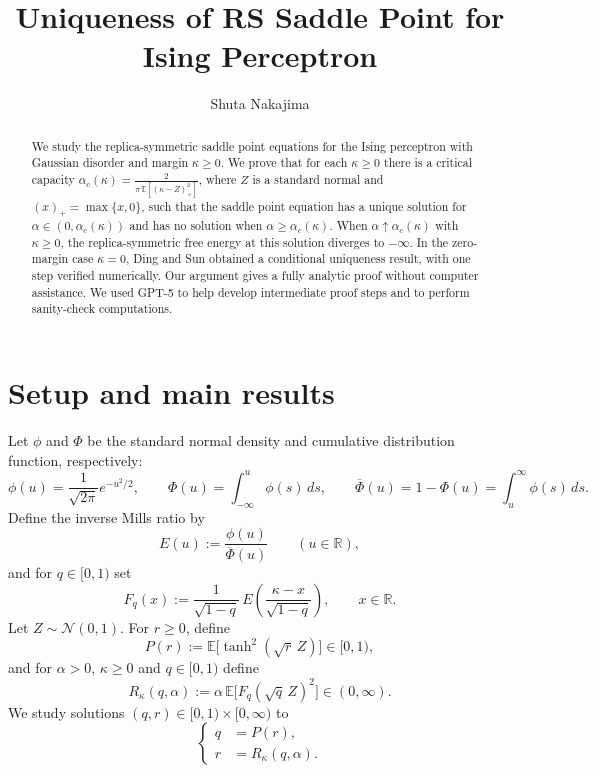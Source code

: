\documentclass[11pt]{article}
\title{Uniqueness of RS Saddle Point for Ising Perceptron}
\author{Shuta Nakajima}
\affil{Department of Mathematics, Keio University}
\date{}
\begin{document}
\maketitle


\begin{abstract}
We study the replica-symmetric saddle point equations for the Ising perceptron with Gaussian disorder and margin $\kappa\ge 0$. We prove that for each $\kappa\ge 0$ there is a critical capacity
$\alpha_c(\kappa)=\frac{2}{\pi\,\mathbb E[(\kappa-Z)_+^2]}$,
where $Z$ is a standard normal and $(x)_+=\max\{x,0\}$, such that the saddle point equation has a unique solution for $\alpha\in(0,\alpha_c(\kappa))$ and has no solution when $\alpha\ge \alpha_c(\kappa)$.
When $\alpha\uparrow \alpha_c(\kappa)$ with $\kappa\geq 0$, the replica-symmetric free energy at this solution  diverges to $-\infty$.
In the zero-margin case $\kappa=0$, Ding and Sun obtained a conditional uniqueness result, with one step verified numerically. Our argument gives a fully analytic proof without computer assistance. We used GPT-5 to help develop intermediate proof steps and to perform sanity-check computations.
\end{abstract}

\section{Setup and main results}

Let $\phi$ and $\Phi$ be the standard normal density and cumulative distribution function, respectively:
\[
\phi(u)=\frac{1}{\sqrt{2\pi}}e^{-u^2/2},
\qquad
\Phi(u)=\int_{-\infty}^u \phi(s)\,ds,
\qquad
\overline{\Phi}(u)=1-\Phi(u)=\int_u^{\infty}\phi(s)\,ds.
\]
Define the inverse Mills ratio by 
\[
E(u):=\frac{\phi(u)}{\overline{\Phi}(u)}\qquad (u\in\mathbb R),
\]
and for $q\in[0,1)$ set
\[
F_q(x):=\frac{1}{\sqrt{1-q}}\,E\!\left(\frac{\kappa-x}{\sqrt{1-q}}\right),\qquad x\in\mathbb R.
\]
Let $Z\sim\mathcal N(0,1)$. For $r\ge 0$, define
\[
P(r):=\mathbb E\big[\tanh^2(\sqrt{r}\,Z)\big]\in[0,1),
\]
and for $\alpha>0,\,\kappa\geq 0$ and $q\in[0,1)$ define
\[
R_{\kappa}(q,\alpha):=\alpha\,\mathbb E\big[F_q(\sqrt{q}\,Z)^2\big]\in(0,\infty).
\]
We study solutions $(q,r)\in[0,1)\times[0,\infty)$ to
\begin{equation}\label{eq:system}
\left\{
\begin{aligned}
q&=P(r),\\
r&=R_{\kappa}(q,\alpha).
\end{aligned}
\right.
\end{equation}
\end{document}

